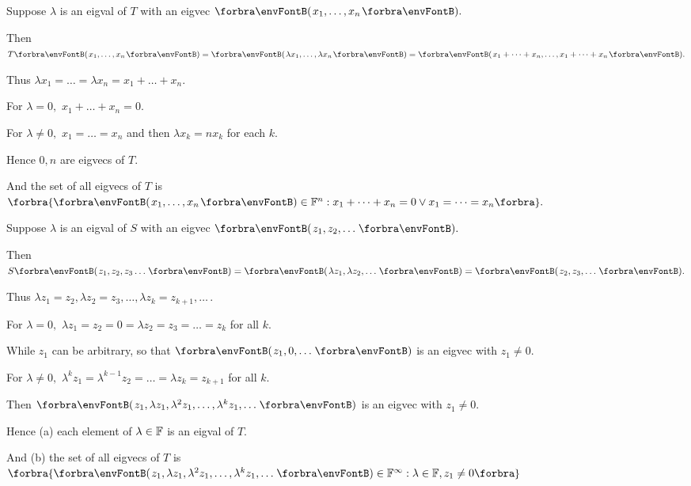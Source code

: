 \documentclass[a4paper, 11pt, UTF8]{article}
\begin{document}
\begin{large}
\par\quad
Suppose $\lambda$ is an eigval of $T$ with an eigvec $\Par{x_1,\dots,x_n}.$\par\quad
Then $T\Par{x_1,\dots,x_n}=\Par{\lambda x_1,\dots,\lambda x_n}=\Par{x_1+\dots+x_n,\dots,x_1+\dots+x_n}.$\par\quad
Thus $\lambda x_1=\dots=\lambda x_n=x_1+\dots+x_n.$\par\quad
For $\lambda=0,$ $x_1+\dots+x_n=0.$\par\quad
For $\lambda\neq 0,$ $x_1=\dots=x_n$ and then $\lambda x_k=n x_k$ for each $k.$\par\quad
Hence $0,n$ are eigvecs of $T.$\par\quad
And the set of all eigvecs of $T$ is $\Bra{\Par{x_1,\dots,x_n}\in\Fbb^n:x_1+\dots+x_n=0\vee x_1=\dots=x_n}.$\PfEnd
\SepLine

\par\quad
Suppose $\lambda$ is an eigval of $S$ with an eigvec $\Par{z_1,z_2,\dots}.$\par\quad
Then $S\Par{z_1,z_2,z_3\dots}=\Par{\lambda z_1,\lambda z_2,\dots}=\Par{z_2,z_3,\dots}.$\par\quad
Thus $\lambda z_1=z_2,\lambda z_2=z_3,\dots,\lambda z_k=z_{k+1},\dots$\,.\par\quad
For $\lambda=0,$ $\lambda z_1=z_2=0=\lambda z_2=z_3=\dots=z_k$ for all $k.$\par\quad
While $z_1$ can be arbitrary, so that $\Par{z_1,0,\dots}$ is an eigvec with $z_1\neq 0.$\par\quad
For $\lambda\neq 0,$ $\lambda^k z_1=\lambda^{k-1} z_2=\dots=\lambda z_k=z_{k+1}$ for all $k.$\par\quad
Then $\Par{z_1,\lambda z_1,\lambda^2 z_1,\dots,\lambda^k z_1,\dots}$ is an eigvec with $z_1\neq 0.$\par\quad
Hence (a) each element of $\lambda\in{\mathbb{F}}$ is an eigval of $T.$\par\quad
And (b) the set of all eigvecs of $T$ is $\Bra{\Par{z_1,\lambda z_1,\lambda^2 z_1,\dots,\lambda^k z_1,\dots}\in\Fbb^\infty:\lambda\in\Fbb,z_1\neq 0}$\PfEnd
\SepLine


\end{large}
\end{document}
